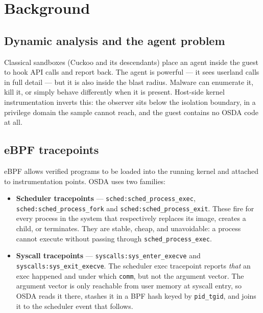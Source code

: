 \documentclass[11pt,a4paper]{article}
\newcommand{\code}[1]{\texttt{\small #1}}
\begin{document}
\section{Background}

\subsection{Dynamic analysis and the agent problem}
Classical sandboxes (Cuckoo and its descendants) place an agent inside the guest to
hook API calls and report back. The agent is powerful --- it sees userland calls in
full detail --- but it is also inside the blast radius. Malware can enumerate it,
kill it, or simply behave differently when it is present. Host-side kernel
instrumentation inverts this: the observer sits below the isolation boundary, in a
privilege domain the sample cannot reach, and the guest contains no OSDA code at all.

\subsection{eBPF tracepoints}
eBPF allows verified programs to be loaded into the running kernel and attached to
instrumentation points. OSDA uses two families:

\begin{itemize}[leftmargin=*]
  \item \textbf{Scheduler tracepoints} --- \code{sched:sched\_process\_exec},
        \code{sched:sched\_process\_fork} and \code{sched:sched\_process\_exit}.
        These fire for every process in the system that respectively replaces its
        image, creates a child, or terminates. They are stable, cheap, and
        unavoidable: a process cannot execute without passing through
        \code{sched\_process\_exec}.
  \item \textbf{Syscall tracepoints} --- \code{syscalls:sys\_enter\_execve} and
        \code{syscalls:sys\_exit\_execve}. The scheduler exec tracepoint reports
        \emph{that} an exec happened and under which \code{comm}, but not the
        argument vector. The argument vector is only reachable from user memory at
        syscall entry, so OSDA reads it there, stashes it in a BPF hash keyed by
        \code{pid\_tgid}, and joins it to the scheduler event that follows.
\end{itemize}
\end{document}

